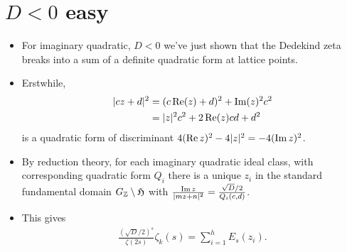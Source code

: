 \documentclass[11pt]{amsart}
\begin{document}
\section{$D<0$ easy}
\begin{itemize}
	\item For imaginary quadratic, $D<0$ we've just shown that the Dedekind zeta breaks into a sum of a definite quadratic form at lattice points. 
	\item Erstwhile, 
		\begin{align*}
			|cz+d|^{2} & = (c\operatorname{Re}(z)+d)^{2}+\operatorname{Im}( z)^{2}c^{2}  \\
							 & =  |z|^{2}c^{2}+2\operatorname{Re}(z) cd+d^{2}
		\end{align*}
		is a quadratic form of discriminant $4(\operatorname{Re} z)^{2}-4|z|^{2}=-4 (\operatorname{Im} z)^{2} $. 
	\item  By reduction theory, for each imaginary quadratic ideal class, with corresponding quadratic form $Q_{i}$  there is a unique $z_{i}$ in the standard fundamental domain $G_{\mathbb{Z}}\setminus \mathfrak{H}$ with $\frac{\operatorname{Im} z}{|mz+n|^{2}}=\frac{\sqrt{D}/2}{Q_{i}(c,d)}$.
	\item This gives 
		\begin{align*}
			\frac{(\sqrt{D}/2)^{s}}{\zeta(2s)} \zeta_{k}(s)= \sum_{i=1}^{h} E_{s}(z_{i}).
		\end{align*} 
\end{itemize}
\end{document}
